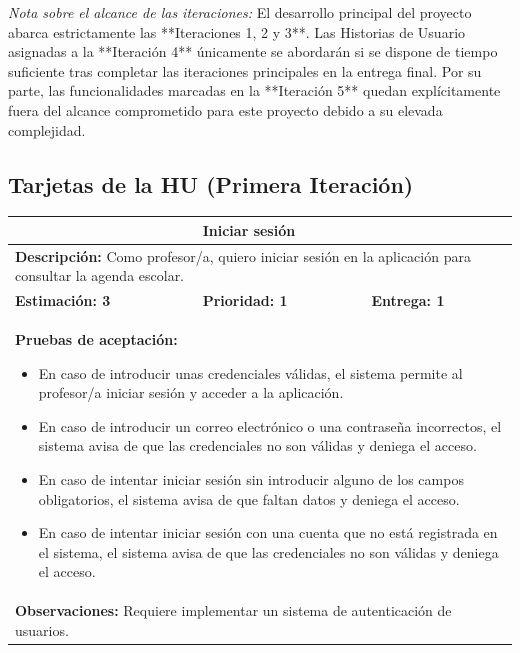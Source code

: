 \noindent\textit{Nota sobre el alcance de las iteraciones:} El desarrollo principal del
 proyecto abarca estrictamente las **Iteraciones 1, 2 y 3**. Las Historias de Usuario asignadas 
 a la **Iteración 4** únicamente se abordarán si se dispone de tiempo suficiente tras completar las iteraciones principales en la entrega final. Por su parte, las funcionalidades marcadas en la **Iteración 5** quedan explícitamente fuera del alcance comprometido para este proyecto debido a su elevada complejidad.
\vspace{0.4cm}
\subsection{Tarjetas de la HU (Primera Iteración)}

\begin{table}[H]
\centering
{}
\begin{tabularx}{\textwidth}{|X|X|X|}
\hline
\rowcolor{azulclaro}
\multicolumn{1}{|l|}{\textbf{Identificador:} HU-P1} & \multicolumn{2}{l|}{\textbf{Iniciar sesión}} \\ \hline
\multicolumn{3}{|p{\dimexpr\textwidth-2\tabcolsep-2\arrayrulewidth}|}{\textbf{Descripción:} Como profesor/a, quiero iniciar sesión en la aplicación para consultar la agenda escolar.} \\ \hline
\rowcolor{white}
\textbf{Estimación: 3} & \textbf{Prioridad: 1} & \textbf{Entrega: 1} \\ \hline
\multicolumn{3}{|p{\dimexpr\textwidth-2\tabcolsep-2\arrayrulewidth}|}{%
\textbf{Pruebas de aceptación:}
\begin{itemize}[leftmargin=1.5em, itemsep=2pt, topsep=3pt]
    \item En caso de introducir unas credenciales válidas, el sistema permite al profesor/a iniciar sesión y acceder a la aplicación.
    \item En caso de introducir un correo electrónico o una contraseña incorrectos, el sistema avisa de que las credenciales no son válidas y deniega el acceso.
    \item En caso de intentar iniciar sesión sin introducir alguno de los campos obligatorios, el sistema avisa de que faltan datos y deniega el acceso.
    \item En caso de intentar iniciar sesión con una cuenta que no está registrada en el sistema, el sistema avisa de que las credenciales no son válidas y deniega el acceso.
\end{itemize}
} \\ \hline
\multicolumn{3}{|p{\dimexpr\textwidth-2\tabcolsep-2\arrayrulewidth}|}{\textbf{Observaciones:} Requiere implementar un sistema de autenticación de usuarios.} \\ \hline
\end{tabularx}
\end{table}

